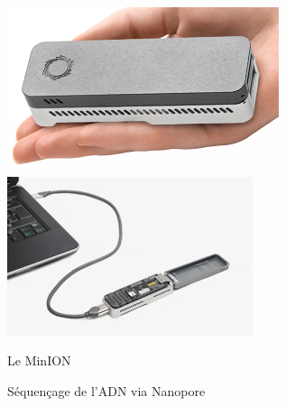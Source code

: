 \documentclass[a4paper,11pt,twoside]{report}
\begin{document}
\begin{figure}[!ht]
\includegraphics[scale=0.75]{Nanoport} \hfill
\includegraphics[scale=0.75]{Nanoport2}
\caption{Le MinION \label{minion}}
\end{figure}

\begin{figure}[!ht]
\caption{Séquençage de l'ADN via Nanopore\label{nano}}
\end{figure}
\end{document}
